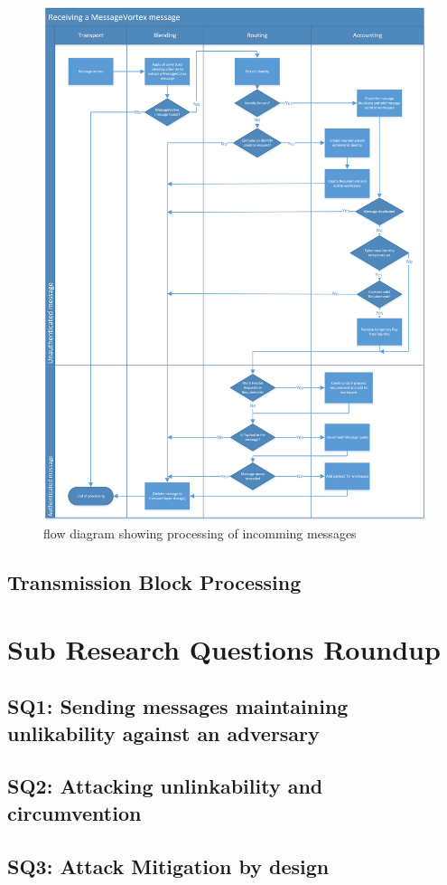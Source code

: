\begin{figure}[hbt]
	\includegraphics[width=\textwidth]{inc/flowchart_message_receiving}
	\caption{flow diagram showing processing of incomming messages}
	\label{fig:msgRecvProcessing}
\end{figure}


\subsection{Transmission Block Processing}

\section{Sub Research Questions Roundup}
\subsection{SQ1: Sending messages maintaining unlikability against an adversary}
\subsection{SQ2: Attacking unlinkability and circumvention}
\subsection{SQ3: Attack Mitigation by design}

